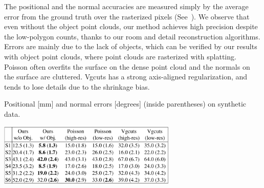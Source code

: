 The positional and the normal accuracies are measured simply by the
average error from the ground truth over the rasterized pixels
(See~). We observe that even without the object
point clouds, our method achieves high precision despite the low-polygon
counts, thanks to our room and detail reconstruction algorithms.
Errors are mainly due to the lack of objects, which can be verified by
our results with object point clouds, where point clouds are rasterized
with splatting. Poisson often overfits the surface on the dense point
cloud and the normals on the surface are cluttered. Vgcuts has a strong
axis-aligned regularization, and tends to lose details due to the
shrinkage bias.
\begin{table}[!t]
\caption{Positional [mm] and normal errors [degrees] (inside
 parentheses) on synthetic data.}
\begin{center}
 \vspace{-0.5cm} 
\includegraphics[width=85mm]{../figures/quantitative2.pdf}
\end{center}
\label{table:quantitative}
 \vspace{-0.3cm}
\end{table}


%
%




